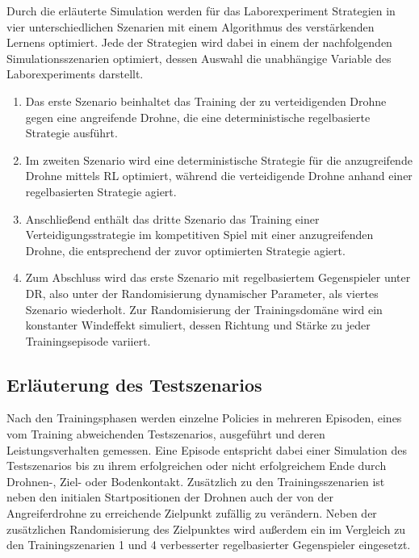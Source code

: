 Durch die erläuterte Simulation werden für das Laborexperiment Strategien in vier unterschiedlichen Szenarien mit einem Algorithmus des verstärkenden Lernens optimiert.
Jede der Strategien wird dabei in einem der nachfolgenden Simulationsszenarien optimiert, dessen Auswahl die unabhängige Variable des Laborexperiments darstellt.
\begin{enumerate}
    \item Das erste Szenario beinhaltet das Training der zu verteidigenden Drohne gegen eine angreifende Drohne, die eine deterministische regelbasierte Strategie ausführt.
    \item Im zweiten Szenario wird eine deterministische Strategie für die anzugreifende Drohne mittels RL optimiert, während die verteidigende Drohne anhand einer regelbasierten Strategie agiert.
    \item Anschließend enthält das dritte Szenario das Training einer Verteidigungsstrategie im kompetitiven Spiel mit einer anzugreifenden Drohne, die entsprechend der zuvor optimierten Strategie agiert.
    \item Zum Abschluss wird das erste Szenario mit regelbasiertem Gegenspieler unter DR, also unter der Randomisierung dynamischer Parameter, als viertes Szenario wiederholt. 
    Zur Randomisierung der Trainingsdomäne wird ein konstanter Windeffekt simuliert, dessen Richtung und Stärke zu jeder Trainingsepisode variiert. 
\end{enumerate}

\subsection{Erläuterung des Testszenarios}

Nach den Trainingsphasen werden einzelne Policies in mehreren Episoden, eines vom Training abweichenden Testszenarios, ausgeführt und deren Leistungsverhalten gemessen.
Eine Episode entspricht dabei einer Simulation des Testszenarios bis zu ihrem erfolgreichen oder nicht erfolgreichem Ende durch Drohnen-, Ziel- oder Bodenkontakt.
Zusätzlich zu den Trainingsszenarien ist neben den initialen Startpositionen der Drohnen auch der von der Angreiferdrohne zu erreichende Zielpunkt zufällig zu verändern.
Neben der zusätzlichen Randomisierung des Zielpunktes wird außerdem ein im Vergleich zu den Trainingszenarien 1 und 4 verbesserter regelbasierter Gegenspieler eingesetzt.

